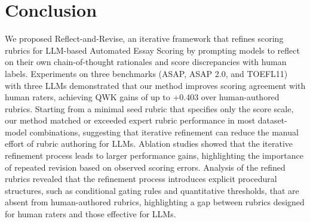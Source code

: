\documentclass[11pt]{article}
\begin{document}

\section{Conclusion}
We proposed Reflect-and-Revise, an iterative framework that refines scoring rubrics for LLM-based Automated Essay Scoring by prompting models to reflect on their own chain-of-thought rationales and score discrepancies with human labels. Experiments on three benchmarks (ASAP, ASAP 2.0, and TOEFL11) with three LLMs demonstrated that our method improves scoring agreement with human raters, achieving QWK gains of up to +0.403 over human-authored rubrics. Starting from a minimal seed rubric that specifies only the score scale, our method matched or exceeded expert rubric performance in most dataset-model combinations, suggesting that iterative refinement can reduce the manual effort of rubric authoring for LLMs. Ablation studies showed that the iterative refinement process leads to larger performance gains, highlighting the importance of repeated revision based on observed scoring errors.
Analysis of the refined rubrics revealed that the refinement process introduces explicit procedural structures, such as conditional gating rules and quantitative thresholds, that are absent from human-authored rubrics, highlighting a gap between rubrics designed for human raters and those effective for LLMs.
\end{document}
